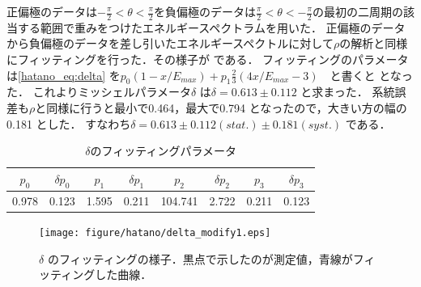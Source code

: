 正偏極のデータは$-\frac{\pi}{2}<\theta<\frac{\pi}{2}$を負偏極のデータは$\frac{\pi}{2}<\theta<-\frac{\pi}{2}$の最初の二周期の該当する範囲で重みをつけたエネルギースペクトラムを用いた．
正偏極のデータから負偏極のデータを差し引いたエネルギースペクトルに対して$\rho$の解析と同様にフィッティングを行った．その様子が である．
フィッティングのパラメータは\eqref{hatano_eq:delta} を$p_0(1-x/E_{max})+p_1\frac{2}{3}(4x/E_{max}-3)$　と書くと となった．
これよりミッシェルパラメータ$\delta$ は$\delta=0.613\pm0.112$ と求まった．
系統誤差も$\rho$と同様に行うと最小で0.464，最大で0.794 となったので，大きい方の幅の0.181 とした．
すなわち$\delta=0.613\pm0.112 (stat.) \pm0.181 (syst.) $ である．

\begin{table}[hbt]
\centering
\caption{$\delta$のフィッティングパラメータ}
\begin{tabular}{cccccccc}
$p_0$ & $\delta p_0$ & $p_1$ & $\delta p_1$ & $p_2$ & $\delta p_2$ & $p_3$ & $\delta p_3$ \\ \hline
0.978 & 0.123 & 1.595 & 0.211 & 104.741 & 2.722 & 0.211 & 0.123 \\
\end{tabular}
\label{hatano_tab:delta}
\end{table}

\begin{figure}[hbt]
\centering
\texttt{[image: figure/hatano/delta\_modify1.eps]}
\caption{$\delta$ のフィッティングの様子．黒点で示したのが測定値，青線がフィッティングした曲線．}
\label{hatano_fig:delta}
\end{figure}

%

